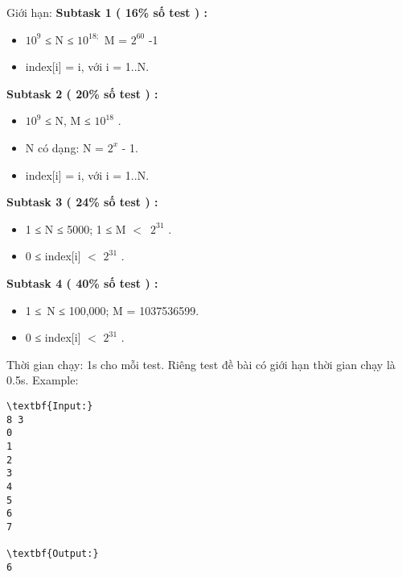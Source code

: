 Giới hạn:
\textbf{Subtask 1 ( 16\% số test ) : }
\begin{itemize}
	\item 

$10^{9}$ ≤ N ≤ $10^{18;}$ M = $2^{60}$ -1
	\item 

index[i] = i, với i = 1..N.
\end{itemize}

\textbf{Subtask 2 ( 20\% số test ) : }
\begin{itemize}
	\item 

$10^{9}$ ≤ N, M ≤ $10^{18}$ .
	\item 

N có dạng: N = $2^{x}$ - 1.
	\item 

index[i] = i, với i = 1..N.
\end{itemize}

\textbf{Subtask 3 ( 24\% số test ) : }
\begin{itemize}
	\item 

1 ≤ N ≤ 5000; 1 ≤ M $<$ $2^{31}$ .
	\item 

0 ≤ index[i] $<$ $2^{31}$ .
\end{itemize}

\textbf{Subtask 4 ( 40\% số test ) : }
\begin{itemize}
	\item 

1 ≤ N ≤ 100,000; M = 1037536599.
	\item 

0 ≤ index[i] $<$ $2^{31}$ .
\end{itemize}

Thời gian chạy: 1s cho mỗi test. Riêng test đề bài có giới hạn thời gian chạy là 0.5s.
Example:
\begin{verbatim}
\textbf{Input:}
8 3
0
1
2
3
4
5
6
7

\textbf{Output:}
6
\end{verbatim}